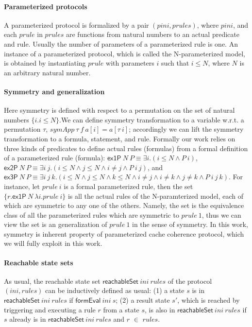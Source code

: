 \documentclass{llncs}
\begin{document}
\paragraph*{Parameterized protocols} A parameterized protocol is formalized by a pair
$(pini,prules)$, where $pini$, and each $prule$ in $prules$ are
functions from natural numbers to an actual predicate and  rule.
Usually the number of parameters of a parameterized rule is one. An
instance of a parameterized protocol, which is called the
N-parameterized model, is obtained by instantiating $prule$ with
parameters $i$ such that $i \le N$, where $N$ is an arbitrary
natural number. %


\paragraph*{Symmetry and generalization} Here symmetry is defined with respect to
a permutation on the set of natural numbers $\{i. i \le N\}$.We can
define symmetry transformation to a variable w.r.t. a permutation
$\tau$, $symApp~\tau~f~a[i]=a[\tau~i]$; accordingly we can lift the
symmetry transformation to a formula, statement, and rule. Formally
our work  relies on three kinds of predicates to define actual rules
(formulas) from a formal definition of a parameterized rule
(formula): $\mathsf{ex1P}~ N~ P \equiv \exists i. (i \le N \wedge P~
i)$, $\mathsf{ex2P}~ N~ P \equiv \exists i~j. (i \le N \wedge j \le
N \wedge i\ne j \wedge P~ i~j)$, and $\mathsf{ex3P}~ N~ P \equiv
\exists i~j~k. (i \le N \wedge j \le N \wedge k \le N\wedge i\ne j
\wedge i\ne k \wedge j\ne k \wedge P~ i~j~k)$. For instance, let
$prule~i$ is a formal parameterized rule, then the set $\{r.
\mathsf{ex1P}~ N~ \lambda i. prule ~i\}$ is all the actual rules of
the N-paramterized model, each of which are symmetric to  any one of
the others. Namely, the set is the equivalence class of all the
parameterized rules which are symmetric to $prule~1$, thus we can
view the set is an generalization of $prule~1$ in the sense of
symmetry. In this work, symmetry is inherent property of
parameterized cache coherence protocol, which we will fully exploit
in this work.

\paragraph*{Reachable state sets} As usual, the reachable state set
$\mathsf{reachableSet}~ ini ~rules$ of the protocol $(ini,rules)$
can be inductively defined as usual: (1) a state $s$ is in
$\mathsf{reachableSet}~ini~ rules$ if
 $\mathsf{formEval}~ini~s$; (2) a result state $s'$, which is reached by triggering and
 executing a rule $r$ from a state $s$, is also in
 $\mathsf{reachableSet}~ini~ rules$ if  $s$ already is in
 $\mathsf{reachableSet}~ini~ rules$ and $r $ $\in$  $rules$.
\end{document}
